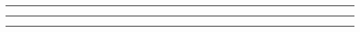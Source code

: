 

\usebox{\topbox}

\vspace{6pt}
\hrule height1pt
\begin{minipage}[t]{21pc}
\vspace*{6pt}
\begin{minipage}[t]{21pc}
  \vspace*{6pt}
  \begin{center}
    \usebox{\statbox}
    \usebox{\personalitybox}
    \usebox{\reputationbox}
  \end{center}
  \hfill
\end{minipage}

  \hrule height1pt
  \vspace{6pt}

\begin{minipage}[t]{21pc}
  \begin{center}
    \usebox{\vfbox}
  \end{center}
  \hfill
\end{minipage}
\end{minipage}
\vrule width 1pt\hfill
\begin{minipage}[t]{21pc}
\vspace*{6pt}
\hspace{-2.5em}
\usebox{\abilitybox}\vfill

\vspace*{6pt}
\end{minipage}
\hrule height1pt
\flushright\CopyRight

\newpage


